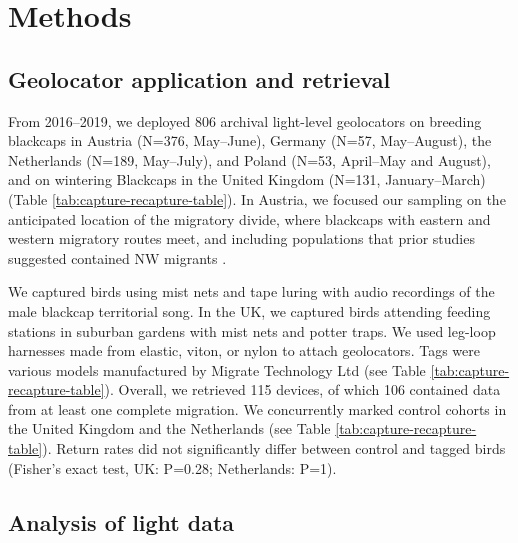 \documentclass[a4paper, nobind]{templates/ociamthesis}
\begin{document}
\hypertarget{methods}{%
\section{Methods}\label{methods}}

\hypertarget{geolocator-application-and-retrieval}{%
\subsection{Geolocator application and retrieval}\label{geolocator-application-and-retrieval}}

From 2016--2019, we deployed 806 archival light-level geolocators on breeding blackcaps in Austria (N=376, May--June), Germany (N=57, May--August), the Netherlands (N=189, May--July), and Poland (N=53, April--May and August), and on wintering Blackcaps in the United Kingdom (N=131, January--March) (Table \ref{tab:capture-recapture-table}). In Austria, we focused our sampling on the anticipated location of the migratory divide, where blackcaps with eastern and western migratory routes meet, and including populations that prior studies suggested contained NW migrants \autocite{helbigPopulationDifferentiationMigratory1992,helbigSESWmigratingBlackcap1991}.

We captured birds using mist nets and tape luring with audio recordings of the male blackcap territorial song. In the UK, we captured birds attending feeding stations in suburban gardens with mist nets and potter traps. We used leg-loop harnesses \autocite{rappoleNewHarnessDesign1991} made from elastic, viton, or nylon to attach geolocators. Tags were various models manufactured by Migrate Technology Ltd (see Table \ref{tab:capture-recapture-table}). Overall, we retrieved 115 devices, of which 106 contained data from at least one complete migration. We concurrently marked control cohorts in the United Kingdom and the Netherlands (see Table \ref{tab:capture-recapture-table}). Return rates did not significantly differ between control and tagged birds (Fisher's exact test, UK: P=0.28; Netherlands: P=1).

\hypertarget{analysis-of-light-data}{%
\subsection{Analysis of light data}\label{analysis-of-light-data}}
\end{document}
